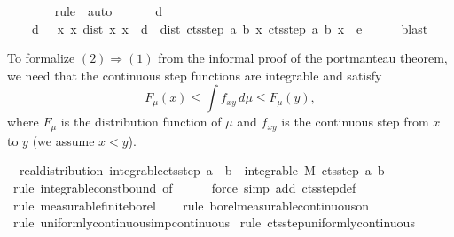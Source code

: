 \documentclass{article}
\theoremstyle{definition}
\begin{document}
\begin{isabellebody}
\ \ \ \ \ \ \isamarkupfalse%
\ {\isacharparenleft}rule\ {\isacharasterisk}{\isacharcomma}\ auto{\isacharparenright}\isanewline
\ \ \isamarkupfalse%
\isanewline
\ \ \isamarkupfalse%
\ {\isacharbackquoteopen}{\isacharquery}d\ {\isachargreater}\ {}{\isacharbackquoteclose}\ \isamarkupfalse%
\ \isanewline
\ \ \ \ {\isachardoublequoteopen}{\isasymexists}d\ {\isachargreater}\ {}{\isachardot}\ {\isasymforall}x\ x{\isacharprime}{\isachardot}\ dist\ x{\isacharprime}\ x\ {\isacharless}\ d\ {\isasymlongrightarrow}\ dist\ {\isacharparenleft}cts{\isacharunderscore}step\ a\ b\ x{\isacharprime}{\isacharparenright}\ {\isacharparenleft}cts{\isacharunderscore}step\ a\ b\ x{\isacharparenright}\ {\isacharless}\ e{\isachardoublequoteclose}\isanewline
\ \ \ \ \isamarkupfalse%
\ blast\isanewline
{}
\end{isabellebody}

\medskip

To formalize $(2) \Longrightarrow (1)$ from the informal proof of the portmanteau theorem, we need that the continuous step functions are integrable and satisfy \[ F_\mu(x) \le \int f_{xy} \, d\mu \le F_\mu(y), \]
where $F_\mu$ is the distribution function of $\mu$ and $f_{xy}$ is the continuous step from $x$ to $y$ (we assume $x < y$).

\medskip

\begin{isabellebody}
\isamarkupfalse%
\ {\isacharparenleft}\ real{\isacharunderscore}distribution{\isacharparenright}\ integrable{\isacharunderscore}cts{\isacharunderscore}step{\isacharcolon}\ {\isachardoublequoteopen}a\ {\isacharless}\ b\ {\isasymLongrightarrow}\ integrable\ M\ {\isacharparenleft}cts{\isacharunderscore}step\ a\ b{\isacharparenright}{\isachardoublequoteclose}\isanewline
{}\isamarkupfalse%
\ {\isacharparenleft}rule\ integrable{\isacharunderscore}const{\isacharunderscore}bound\ {\isacharbrackleft}of\ {\isacharunderscore}\ {}{\isacharbrackright}{\isacharparenright}\isanewline
\ \ \isamarkupfalse%
\ {\isacharparenleft}force\ simp\ add{\isacharcolon}\ cts{\isacharunderscore}step{\isacharunderscore}def{\isacharparenright}\isanewline
\ \ \isamarkupfalse%
\ {\isacharparenleft}rule\ measurable{\isacharunderscore}finite{\isacharunderscore}borel{\isacharparenright}\isanewline
\ \ \isamarkupfalse%
\ {\isacharparenleft}rule\ borel{\isacharunderscore}measurable{\isacharunderscore}continuous{\isacharunderscore}on{}{\isacharparenright}\isanewline
\ \ \isamarkupfalse%
\ {\isacharparenleft}rule\ uniformly{\isacharunderscore}continuous{\isacharunderscore}imp{\isacharunderscore}continuous{\isacharparenright}\isanewline
{}\isamarkupfalse%
\ {\isacharparenleft}rule\ cts{\isacharunderscore}step{\isacharunderscore}uniformly{\isacharunderscore}continuous{\isacharparenright}
\end{isabellebody}
\end{document}
